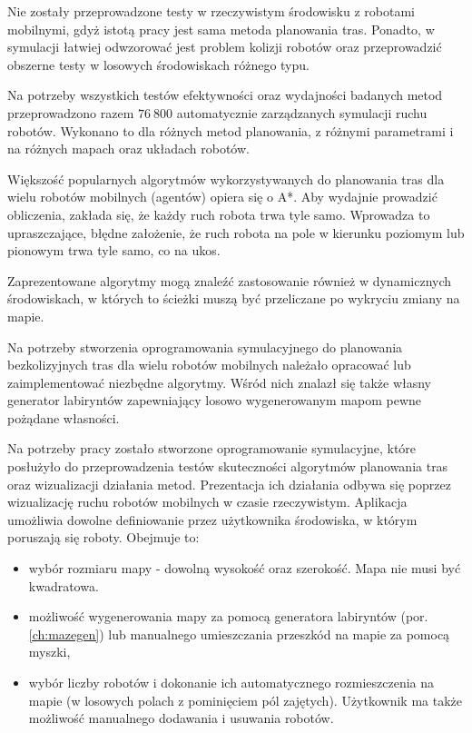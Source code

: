 Nie zostały przeprowadzone testy w rzeczywistym środowisku z robotami mobilnymi, gdyż istotą pracy jest sama metoda planowania tras.
Ponadto, w symulacji łatwiej odwzorować jest problem kolizji robotów oraz przeprowadzić obszerne testy w losowych środowiskach różnego typu.

Na potrzeby wszystkich testów efektywności oraz wydajności badanych metod przeprowadzono razem $76\ 800$ automatycznie zarządzanych symulacji ruchu robotów. Wykonano to dla różnych metod planowania, z różnymi parametrami i na różnych mapach oraz układach robotów.

Większość popularnych algorytmów wykorzystywanych do planowania tras dla wielu robotów mobilnych (agentów) opiera się o A*.
Aby wydajnie prowadzić obliczenia, zakłada się, że każdy ruch robota trwa tyle samo. 
Wprowadza to upraszczające, błędne założenie, że ruch robota na pole w kierunku poziomym lub pionowym trwa tyle samo, co na ukos.

Zaprezentowane algorytmy mogą znaleźć zastosowanie również w dynamicznych środowiskach, w których to ścieżki muszą być przeliczane po wykryciu zmiany na mapie.

Na potrzeby stworzenia oprogramowania symulacyjnego do planowania bezkolizyjnych tras dla wielu robotów mobilnych należało opracować lub zaimplementować niezbędne algorytmy.
Wśród nich znalazł się także własny generator labiryntów zapewniający losowo wygenerowanym mapom pewne pożądane własności.

Na potrzeby pracy zostało stworzone oprogramowanie symulacyjne, które posłużyło do przeprowadzenia testów skuteczności algorytmów planowania tras oraz wizualizacji działania metod.
Prezentacja ich działania odbywa się poprzez wizualizację ruchu robotów mobilnych w czasie rzeczywistym.
Aplikacja umożliwia dowolne definiowanie przez użytkownika środowiska, w którym poruszają się roboty. Obejmuje to:
\begin{itemize}
	\item wybór rozmiaru mapy - dowolną wysokość oraz szerokość. Mapa nie musi być kwadratowa.
	\item możliwość wygenerowania mapy za pomocą generatora labiryntów (por. \ref{ch:mazegen}) lub manualnego umieszczania przeszkód na mapie za pomocą myszki,
	\item wybór liczby robotów i dokonanie ich automatycznego rozmieszczenia na mapie (w losowych polach z pominięciem pól zajętych). Użytkownik ma także możliwość manualnego dodawania i usuwania robotów.
\end{itemize}

